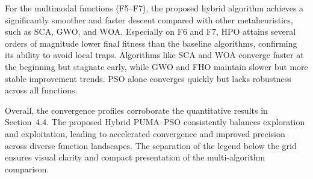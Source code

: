 \documentclass[a4paper,12pt]{article}
\begin{document}
For the multimodal functions (F5–F7), the proposed hybrid algorithm achieves a 
significantly smoother and faster descent compared with other metaheuristics, such as 
SCA, GWO, and WOA. Especially on F6 and F7, HPO attains several orders of magnitude 
lower final fitness than the baseline algorithms, confirming its ability to avoid local 
traps. Algorithms like SCA and WOA converge faster at the beginning but stagnate early, 
while GWO and FHO maintain slower but more stable improvement trends. PSO alone 
converges quickly but lacks robustness across all functions.

Overall, the convergence profiles corroborate the quantitative results in 
Section~4.4. The proposed Hybrid PUMA–PSO consistently balances exploration and 
exploitation, leading to accelerated convergence and improved precision across diverse 
function landscapes. The separation of the legend below the grid ensures visual clarity 
and compact presentation of the multi-algorithm comparison.
\end{document}
